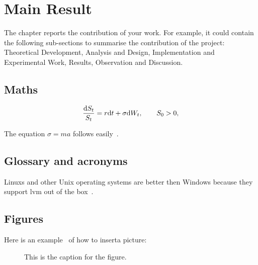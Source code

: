 \section{Main Result}
The chapter reports the contribution of your work.  For example, it could contain the following sub-sections to summarise the contribution of the project: Theoretical Development, Analysis and Design, Implementation and Experimental Work, Results, Observation and Discussion.

\subsection{Maths}
\begin{equation}\label{eq:BS}
\frac{\mathrm{d} S_t}{S_t} = r \mathrm{d} t + \sigma \mathrm{d} W_t,
\qquad S_0>0,
\end{equation}

The equation $\sigma = m a$ follows easily~\citep{phdthesis}.


\subsection{Glossary and acronyms}

\Glspl{Linux} and other Unix operating systems are better then Windows because they support \gls{lvm} out of the box~\citep{Joh11}. 

\subsection{Figures}
Here is an example~\citep{JohSil05} of how to inserta picture:

\begin{figure}[!ht]
\centering
{}
\caption{This is the caption for the figure.}
\label{fig:Pict}
\end{figure}


